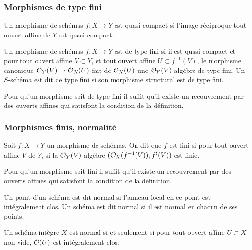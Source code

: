 \subsubsection{Morphismes de type fini}

\begin{defn}
Un morphisme de schémas $f:X\rightarrow Y$ est quasi-compact si l'image réciproque tout ouvert affine de $Y$ est quasi-compact. 
\end{defn}

\begin{defn}
Un morphisme de schémas $f:X\rightarrow Y$ est de type fini si il est quasi-compact et pour tout ouvert affine $V\subset Y$, et tout ouvert affine $U\subset f^{-1}(V)$, le morphisme canonique $\mathcal{O}_Y(V)\rightarrow \mathcal{O}_X(U)$ fait de $\mathcal{O}_X(U)$ une $\mathcal{O}_Y(V)$-algèbre de type fini. Un $S$-schéma est dit de type fini si son morphisme structural est de type fini.
\end{defn}

\begin{rem}
Pour qu'un morphisme soit de type fini il suffit qu'il existe un recouvrement par des ouverts affines qui satisfont la condition de la définition.
\end{rem}

\subsubsection{Morphismes finis, normalité}

\begin{defn}
Soit $f:X \rightarrow Y$ un morphisme de schémas. On dit que $f$ est fini si pour tout ouvert affine $V$ de $Y$, si la $\mathcal{O}_Y(V)$-algèbre $(\mathcal{O}_X(f^{-1}(V)), f^\sharp(V))$ est finie.
\end{defn}

\begin{rem}
Pour qu'un morphisme soit fini il suffit qu'il existe un recouvrement par des ouverts affines qui satisfont la condition de la définition.
\end{rem}


\begin{defn}
Un point d'un schéma est dit normal si l'anneau local en ce point est intégralement clos.
Un schéma est dit normal si il est normal en chacun de ses points.
\end{defn}

\begin{prop}
Un schéma intègre $X$ est normal si et seulement si pour tout ouvert affine $U\subset X$ non-vide, $\mathcal{O}(U)$ est intégralement clos.
\end{prop}

